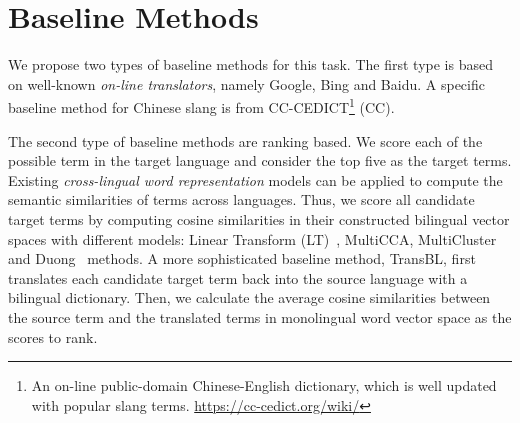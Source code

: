 \section{Baseline Methods}
We propose two types of baseline methods for this task. 
The first type is based on well-known {\em on-line translators}, 
namely Google, 
Bing and Baidu.  
A specific baseline method for Chinese slang is from CC-CEDICT\footnote{{\scriptsize An on-line public-domain Chinese-English dictionary, which is well updated with popular slang terms. \url{https://cc-cedict.org/wiki/}}} (CC).


The second type of baseline methods are ranking based. 
We score each of the possible term in the target language and consider the top five as the target 
terms. 
Existing \textit{cross-lingual word representation} models can be applied to compute the semantic similarities of terms across languages.
Thus, we score all candidate target terms by computing cosine similarities in their constructed bilingual vector spaces with different models: Linear Transform (LT)~\cite{Mikolov:2013tp}, MultiCCA, MultiCluster~\cite{ammar2016massively} and Duong~\cite{DBLP:conf/emnlp/DuongKMBC16} methods. 
A more sophisticated baseline method, TransBL, first translates each candidate target term back into the source language with a bilingual dictionary. Then, we calculate the average cosine similarities between the source term and the translated terms in monolingual word vector space as the scores to rank. 
\vspace{-10pt}
